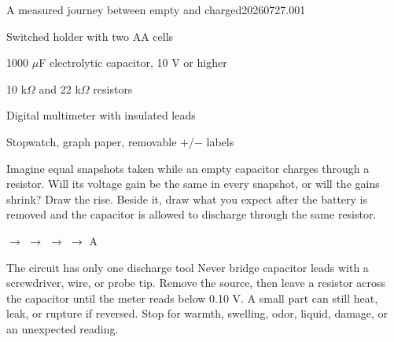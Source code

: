 

  {A measured journey between empty and charged}{20260727.001}

\newcommand{\tickbox}{\raisebox{.12ex}{\fbox{\rule{0pt}{.72ex}\rule{.72ex}{0pt}}}}
\newcommand{\writein}[1]{\rule{#1}{.3pt}}


\begingroup\footnotesize

\begin{materials}
\item Switched holder with two AA cells
\item 1000 \(\mu\)F electrolytic capacitor, 10 V or higher
\item 10 k\(\Omega\) and 22 k\(\Omega\) resistors
\item Digital multimeter with insulated leads
\item Stopwatch, graph paper, removable \(+\)/\( - \) labels
\end{materials}

\begin{predict}
Imagine equal snapshots taken while an empty capacitor charges through a
resistor. Will its voltage gain be the same in every snapshot, or will the gains
shrink? Draw the rise. Beside it, draw what you expect after the battery is
removed and the capacitor is allowed to discharge through the same resistor.
\end{predict}


\begin{center}\vspace{-.7em}\scriptsize
{}
\(\longrightarrow\)
\(\longrightarrow\)
\(\longrightarrow\)
\(\longrightarrow\) A
\vspace{-.7em}
\end{center}

\vspace{-5pt}
\begin{teloshazard}{The circuit has only one discharge tool}
Never bridge capacitor leads with a screwdriver, wire, or probe tip. Remove the
source, then leave a resistor across the capacitor until the meter reads below
0.10 V. A small part can still heat, leak, or rupture if reversed. Stop for
warmth, swelling, odor, liquid, damage, or an unexpected reading.
\end{teloshazard}
\vspace{-5pt}

